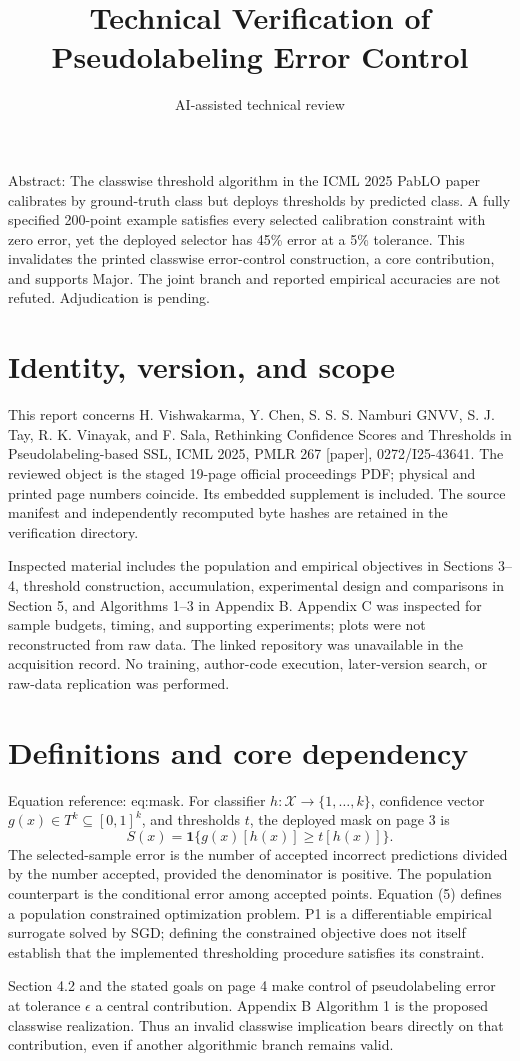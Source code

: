 \documentclass[10pt]{article}
\title{Technical Verification of Pseudolabeling Error Control}
\author{AI-assisted technical review}
\date{}
\begin{document}
\maketitle
Abstract: The classwise threshold algorithm in the ICML 2025 PabLO paper calibrates by ground-truth class but deploys thresholds by predicted class. A fully specified 200-point example satisfies every selected calibration constraint with zero error, yet the deployed selector has 45\% error at a 5\% tolerance. This invalidates the printed classwise error-control construction, a core contribution, and supports Major. The joint branch and reported empirical accuracies are not refuted. Adjudication is pending.\par
\section*{Identity, version, and scope}
This report concerns H. Vishwakarma, Y. Chen, S. S. S. Namburi GNVV, S. J. Tay, R. K. Vinayak, and F. Sala, Rethinking Confidence Scores and Thresholds in Pseudolabeling-based SSL, ICML 2025, PMLR 267 [paper], 0272/I25-43641. The reviewed object is the staged 19-page official proceedings PDF; physical and printed page numbers coincide. Its embedded supplement is included. The source manifest and independently recomputed byte hashes are retained in the verification directory.\par
Inspected material includes the population and empirical objectives in Sections 3–4, threshold construction, accumulation, experimental design and comparisons in Section 5, and Algorithms 1–3 in Appendix B. Appendix C was inspected for sample budgets, timing, and supporting experiments; plots were not reconstructed from raw data. The linked repository was unavailable in the acquisition record. No training, author-code execution, later-version search, or raw-data replication was performed.\par
\section*{Definitions and core dependency}
Equation reference: eq:mask. For classifier \(h:\mathcal X\to\{1,\ldots,k\}\), confidence vector \(g(x)\in T^k\subseteq[0,1]^k\), and thresholds \(t\), the deployed mask on page 3 is \[
 S(x)=\mathbf1\{g(x)[h(x)]\geq t[h(x)]\}.\] The selected-sample error is the number of accepted incorrect predictions divided by the number accepted, provided the denominator is positive. The population counterpart is the conditional error among accepted points. Equation (5) defines a population constrained optimization problem. P1 is a differentiable empirical surrogate solved by SGD; defining the constrained objective does not itself establish that the implemented thresholding procedure satisfies its constraint.\par
Section 4.2 and the stated goals on page 4 make control of pseudolabeling error at tolerance \(\epsilon\) a central contribution. Appendix B Algorithm 1 is the proposed classwise realization. Thus an invalid classwise implication bears directly on that contribution, even if another algorithmic branch remains valid.\par
\end{document}
